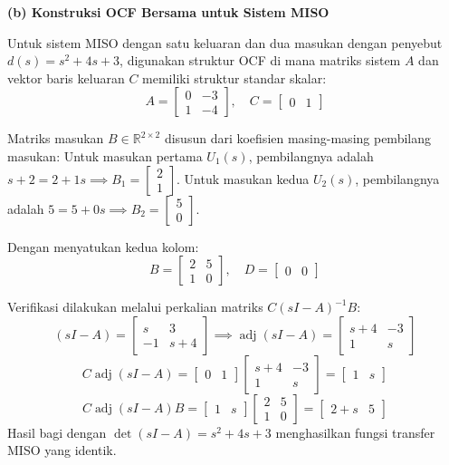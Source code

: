 \documentclass[11pt,a4paper]{article}
\begin{document}
\textbf{(b) Konstruksi OCF Bersama untuk Sistem MISO}

Untuk sistem MISO dengan satu keluaran dan dua masukan dengan penyebut $d(s) = s^2 + 4s + 3$, digunakan struktur OCF di mana matriks sistem $A$ dan vektor baris keluaran $C$ memiliki struktur standar skalar:
$$A = \begin{bmatrix} 0 & -3 \\ 1 & -4 \end{bmatrix}, \quad C = \begin{bmatrix} 0 & 1 \end{bmatrix}$$

Matriks masukan $B \in \mathbb{R}^{2 \times 2}$ disusun dari koefisien masing-masing pembilang masukan:
Untuk masukan pertama $U_1(s)$, pembilangnya adalah $s + 2 = 2 + 1s \implies B_1 = \begin{bmatrix} 2 \\ 1 \end{bmatrix}$.
Untuk masukan kedua $U_2(s)$, pembilangnya adalah $5 = 5 + 0s \implies B_2 = \begin{bmatrix} 5 \\ 0 \end{bmatrix}$.

Dengan menyatukan kedua kolom:
$$B = \begin{bmatrix} 2 & 5 \\ 1 & 0 \end{bmatrix}, \quad D = \begin{bmatrix} 0 & 0 \end{bmatrix}$$

Verifikasi dilakukan melalui perkalian matriks $C(sI - A)^{-1} B$:
$$(sI - A) = \begin{bmatrix} s & 3 \\ -1 & s+4 \end{bmatrix} \implies \operatorname{adj}(sI - A) = \begin{bmatrix} s+4 & -3 \\ 1 & s \end{bmatrix}$$
$$C \operatorname{adj}(sI - A) = \begin{bmatrix} 0 & 1 \end{bmatrix} \begin{bmatrix} s+4 & -3 \\ 1 & s \end{bmatrix} = \begin{bmatrix} 1 & s \end{bmatrix}$$
$$C \operatorname{adj}(sI - A) B = \begin{bmatrix} 1 & s \end{bmatrix} \begin{bmatrix} 2 & 5 \\ 1 & 0 \end{bmatrix} = \begin{bmatrix} 2 + s & 5 \end{bmatrix}$$
Hasil bagi dengan $\det(sI - A) = s^2 + 4s + 3$ menghasilkan fungsi transfer MISO yang identik.
\end{document}
